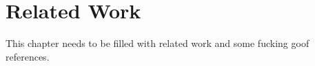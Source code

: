 \chapter{Related Work}\label{ch:related}

This chapter needs to be filled with related work and some fucking goof references.

